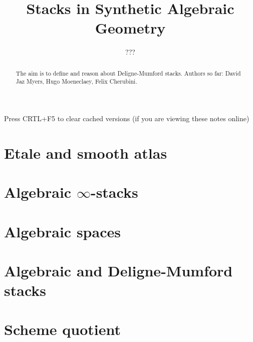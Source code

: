 \documentclass{../util/zariski}
\title{Stacks in Synthetic Algebraic Geometry}
\author{???}
\begin{document}
\maketitle

\begin{center}
  \color{purple}
  \large{Press CRTL+F5 to clear cached versions}
  \large{(if you are viewing these notes online)}
\end{center}

\begin{abstract}
  The aim is to define and reason about Deligne-Mumford stacks.
  Authors so far: David Jaz Myers, Hugo Moeneclaey, Felix Cherubini.
\end{abstract}

\tableofcontents

\section{Etale and smooth atlas}


\section{Algebraic $\infty$-stacks}


\section{Algebraic spaces}


\section{Algebraic and Deligne-Mumford stacks}


\section{Scheme quotient}


\printindex

\printbibliography
\end{document}
